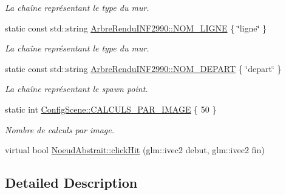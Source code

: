 \begin{DoxyCompactItemize}
\begin{DoxyCompactList}\small\item\em La chaîne représentant le type du mur. \end{DoxyCompactList}\item 
\hypertarget{group__inf2990_ga776d72e2b41b06f1992ba48b1ed3de0b}{}static const std\+::string \hyperlink{group__inf2990_ga776d72e2b41b06f1992ba48b1ed3de0b}{Arbre\+Rendu\+I\+N\+F2990\+::\+N\+O\+M\+\_\+\+L\+I\+G\+N\+E} \{ \char`\"{}ligne\char`\"{} \}\label{group__inf2990_ga776d72e2b41b06f1992ba48b1ed3de0b}

\begin{DoxyCompactList}\small\item\em La chaîne représentant le type du mur. \end{DoxyCompactList}\item 
\hypertarget{group__inf2990_ga7f23ccbd07f9afea9685f108c4053834}{}static const std\+::string \hyperlink{group__inf2990_ga7f23ccbd07f9afea9685f108c4053834}{Arbre\+Rendu\+I\+N\+F2990\+::\+N\+O\+M\+\_\+\+D\+E\+P\+A\+R\+T} \{ \char`\"{}depart\char`\"{} \}\label{group__inf2990_ga7f23ccbd07f9afea9685f108c4053834}

\begin{DoxyCompactList}\small\item\em La chaîne représentant le spawn point. \end{DoxyCompactList}\item 
\hypertarget{group__inf2990_gadb487b450a0314a5d1f75cf31ce502eb}{}static int \hyperlink{group__inf2990_gadb487b450a0314a5d1f75cf31ce502eb}{Config\+Scene\+::\+C\+A\+L\+C\+U\+L\+S\+\_\+\+P\+A\+R\+\_\+\+I\+M\+A\+G\+E} \{ 50 \}\label{group__inf2990_gadb487b450a0314a5d1f75cf31ce502eb}

\begin{DoxyCompactList}\small\item\em Nombre de calculs par image. \end{DoxyCompactList}\end{DoxyCompactItemize}
\begin{DoxyCompactItemize}
\item 
virtual bool \hyperlink{group__inf2990_gad1d1a9c6adcedfcd5eda6c6d4e67a50f}{Noeud\+Abstrait\+::click\+Hit} (glm\+::ivec2 debut, glm\+::ivec2 fin)
\end{DoxyCompactItemize}


\subsection{Detailed Description}


